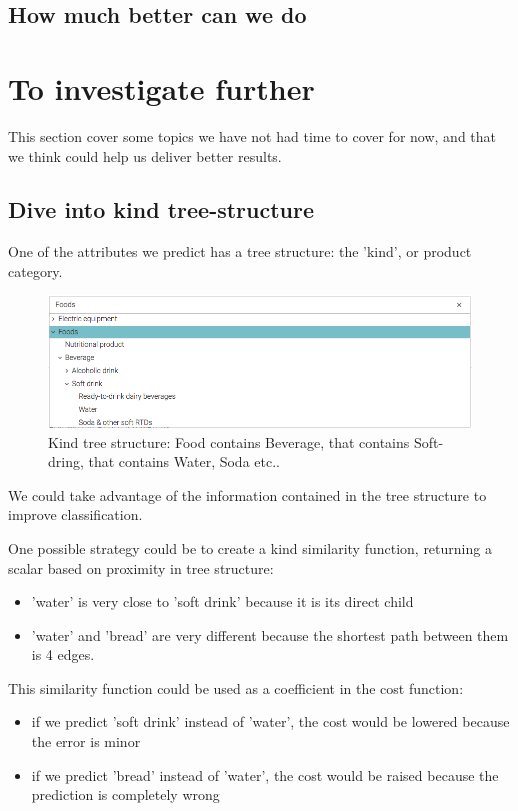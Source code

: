 \subsection{How much better can we do}




\section{To investigate further}

This section cover some topics we have not had time to cover for now, and that we think could help us deliver better results.

\subsection{Dive into kind tree-structure}
One of the attributes we predict has a tree structure: the 'kind', or product category. 

\begin{figure}[H]
\centering
\includegraphics[scale=0.5]{./images/to-investigate/tree-structure.png}
\caption{Kind tree structure: Food contains Beverage, that contains Soft-dring, that contains Water, Soda etc..}
\end{figure}

We could take advantage of the information contained in the tree structure to improve classification. 

One possible strategy could be to create a kind similarity function, returning a scalar based on proximity in tree structure:
\begin{itemize}
	\item 'water' is very close to 'soft drink' because it is its direct child
	\item 'water' and 'bread' are very different because the shortest path between them is 4 edges.
\end{itemize}

This similarity function could be used as a coefficient in the cost function: 
\begin{itemize}
	\item if we predict 'soft drink' instead of 'water', the cost would be lowered because the error is minor
	\item if we predict 'bread' instead of 'water', the cost would be raised because the prediction is completely wrong
\end{itemize}

